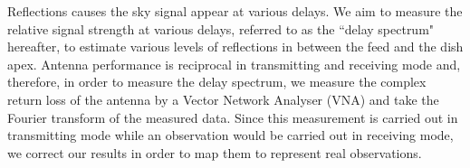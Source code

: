 \documentclass[12pt,preprint]{aastex}
\begin{document}
Reflections causes the sky signal appear at various delays. We aim to measure the relative signal strength at various
delays, referred to as the ``delay spectrum" hereafter, to estimate various
levels of reflections in between the feed and the dish apex. Antenna performance is reciprocal in transmitting and receiving mode and, therefore, in order to measure the delay spectrum, we measure the complex return loss of the antenna by a Vector Network Analyser (VNA) and take the Fourier transform of the measured data. 
Since this measurement is carried out in
transmitting mode while an observation would be carried out in receiving mode,
we correct our results in order to map them to represent real observations.

%



 

\end{document}
